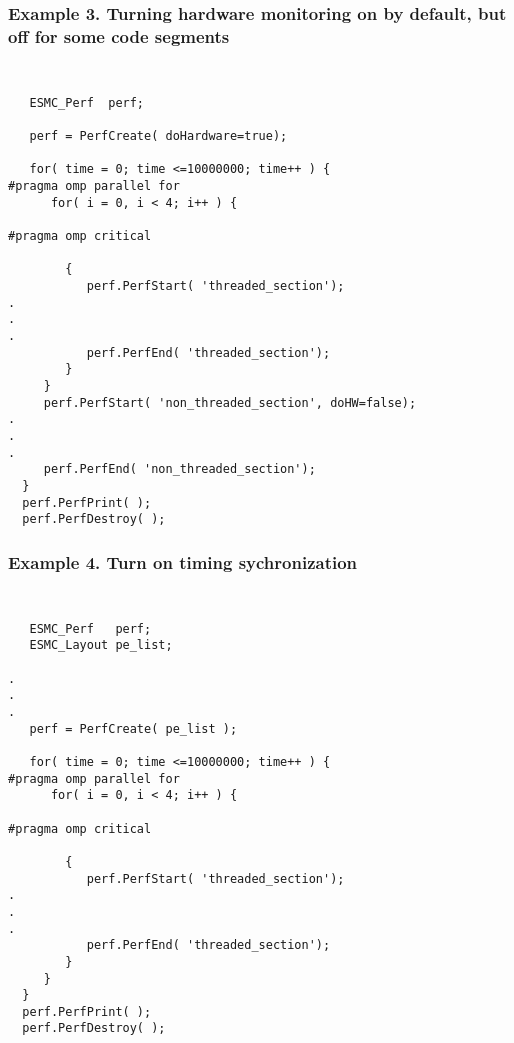 \subsubsection{Example 3. Turning hardware monitoring on by default, but off 
for some code segments}
{\tt
\begin{verbatim}
   ESMC_Perf  perf;

   perf = PerfCreate( doHardware=true);

   for( time = 0; time <=10000000; time++ ) {
#pragma omp parallel for
      for( i = 0, i < 4; i++ ) {

#pragma omp critical

        {
           perf.PerfStart( 'threaded_section');
.
.
.
           perf.PerfEnd( 'threaded_section');
        }
     }
     perf.PerfStart( 'non_threaded_section', doHW=false);
.
.
.
     perf.PerfEnd( 'non_threaded_section');
  }
  perf.PerfPrint( );
  perf.PerfDestroy( );
\end{verbatim}
}

\subsubsection{Example 4. Turn on timing sychronization}
{\tt
\begin{verbatim}
   ESMC_Perf   perf;
   ESMC_Layout pe_list;

.
.
.
   perf = PerfCreate( pe_list );

   for( time = 0; time <=10000000; time++ ) {
#pragma omp parallel for
      for( i = 0, i < 4; i++ ) {

#pragma omp critical

        {
           perf.PerfStart( 'threaded_section');
.
.
.
           perf.PerfEnd( 'threaded_section');
        }
     }
  }
  perf.PerfPrint( );
  perf.PerfDestroy( );
\end{verbatim}
}
